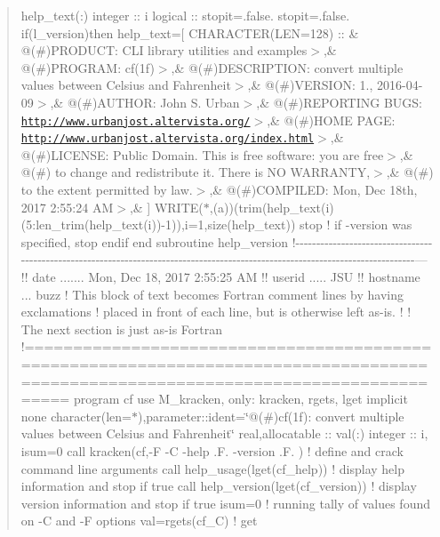 \begin{quote}
help\+\_\+text(\+:) integer \+:\+: i logical \+:\+: stopit=.false. stopit=.false. if(l\+\_\+version)then help\+\_\+text=\mbox{[} C\+H\+A\+R\+A\+C\+T\+ER(L\+EN=128) \+:\+: \& \textquotesingle{}@(\#)P\+R\+O\+D\+U\+CT\+: C\+LI library utilities and examples$>$\textquotesingle{},\& \textquotesingle{}@(\#)P\+R\+O\+G\+R\+AM\+: cf(1f)$>$\textquotesingle{},\& \textquotesingle{}@(\#)D\+E\+S\+C\+R\+I\+P\+T\+I\+ON\+: convert multiple values between Celsius and Fahrenheit$>$\textquotesingle{},\& \textquotesingle{}@(\#)V\+E\+R\+S\+I\+ON\+: 1., 2016-\/04-\/09$>$\textquotesingle{},\& \textquotesingle{}@(\#)A\+U\+T\+H\+OR\+: John S. Urban$>$\textquotesingle{},\& \textquotesingle{}@(\#)R\+E\+P\+O\+R\+T\+I\+NG B\+U\+GS\+: \href{http://www.urbanjost.altervista.org/}{\tt http\+://www.\+urbanjost.\+altervista.\+org/}$>$\textquotesingle{},\& \textquotesingle{}@(\#)H\+O\+ME P\+A\+GE\+: \href{http://www.urbanjost.altervista.org/index.html}{\tt http\+://www.\+urbanjost.\+altervista.\+org/index.\+html}$>$\textquotesingle{},\& \textquotesingle{}@(\#)L\+I\+C\+E\+N\+SE\+: Public Domain. This is free software\+: you are free$>$\textquotesingle{},\& \textquotesingle{}@(\#) to change and redistribute it. There is NO W\+A\+R\+R\+A\+N\+TY,$>$\textquotesingle{},\& \textquotesingle{}@(\#) to the extent permitted by law.$>$\textquotesingle{},\& \textquotesingle{}@(\#)C\+O\+M\+P\+I\+L\+ED\+: Mon, Dec 18th, 2017 2\+:55\+:24 AM$>$\textquotesingle{},\& \textquotesingle{}\textquotesingle{}\mbox{]} W\+R\+I\+TE($\ast$,\textquotesingle{}(a)\textquotesingle{})(trim(help\+\_\+text(i)(5\+:len\+\_\+trim(help\+\_\+text(i))-\/1)),i=1,size(help\+\_\+text)) stop ! if -\/version was specified, stop endif end subroutine help\+\_\+version !-\/-\/-\/-\/-\/-\/-\/-\/-\/-\/-\/-\/-\/-\/-\/-\/-\/-\/-\/-\/-\/-\/-\/-\/-\/-\/-\/-\/-\/-\/-\/-\/-\/-\/-\/-\/-\/-\/-\/-\/-\/-\/-\/-\/-\/-\/-\/-\/-\/-\/-\/-\/-\/-\/-\/-\/-\/-\/-\/-\/-\/-\/-\/-\/-\/-\/-\/-\/-\/-\/-\/-\/-\/-\/-\/-\/-\/-\/-\/-\/-\/-\/-\/-\/-\/-\/-\/-\/-\/-\/-\/-\/-\/-\/-\/-\/-\/-\/-\/-\/-\/-\/-\/-\/-\/-\/-\/-\/-\/-\/-\/-\/-\/-\/-\/-\/-\/-\/-\/-\/-\/-\/-\/-\/-\/-\/-\/-\/--- !! date ....... Mon, Dec 18, 2017 2\+:55\+:25 AM !! userid ..... J\+SU !! hostname ... buzz ! This block of text becomes Fortran comment lines by having exclamations ! placed in front of each line, but is otherwise left as-\/is. ! ! The next section is just as-\/is Fortran !=================================================================================================================================== program cf use M\+\_\+kracken, only\+: kracken, rgets, lget implicit none character(len=$\ast$),parameter\+::ident=\char`\"{}@(\#)cf(1f)\+: convert multiple values between Celsius and Fahrenheit\char`\"{} real,allocatable \+:\+: val(\+:) integer \+:\+: i, isum=0 call kracken(\textquotesingle{}cf\textquotesingle{},\textquotesingle{}-\/F -\/C -\/help .F. -\/version .F.\textquotesingle{} ) ! define and crack command line arguments call help\+\_\+usage(lget(\textquotesingle{}cf\+\_\+help\textquotesingle{})) ! display help information and stop if true call help\+\_\+version(lget(\textquotesingle{}cf\+\_\+version\textquotesingle{})) ! display version information and stop if true isum=0 ! running tally of values found on -\/C and -\/F options val=rgets(\textquotesingle{}cf\+\_\+C\textquotesingle{}) ! get 
\end{quote}
